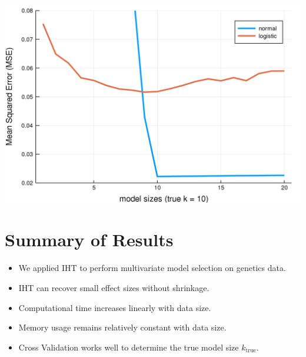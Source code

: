 \documentclass[a0,portrait]{a0poster}
\begin{document}
\begin{multicols}{2}
\begin{center}\vspace{1cm}
\includegraphics[width=0.7\linewidth]{figures/mse.png}
\end{center} 

\color{Navy}
\section*{Summary of Results}
\color{Black}

\begin{itemize}
	\item We applied IHT to perform multivariate model selection on genetics data.
	\item IHT can recover small effect sizes without shrinkage. 
	\item Computational time increases linearly with data size. 
	\item Memory usage remains relatively constant with data size.
	\item Cross Validation works well to determine the true model size $k_{\text{true}}$. 
\end{itemize}



\color{Navy}

\end{multicols}
\end{document}
